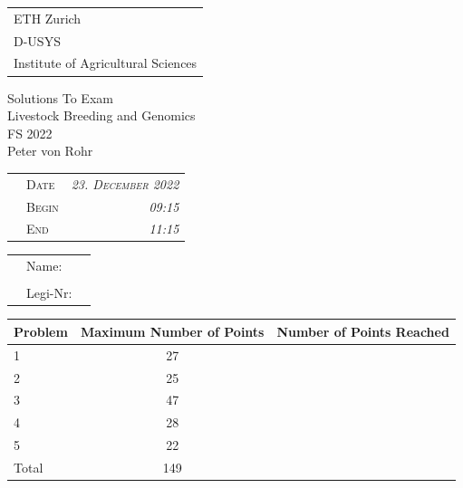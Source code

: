 \documentclass[
]{article}
\author{}
\date{\vspace{-2.5em}}
\begin{document}
\thispagestyle{empty}

\begin{tabular}{l}
ETH Zurich \\
D-USYS\\
Institute of Agricultural Sciences\\
\end{tabular}

\vspace{15ex}
\begin{center}
\huge
Solutions To Exam\\ \vspace{1ex}
Livestock Breeding and Genomics \\  \vspace{1ex}
FS 2022 \\

\normalsize
\vspace{7ex}
Peter von Rohr 
\end{center}

\vspace{7ex}
\begin{tabular}{p{5cm}lr}
  & \textsc{Date}  & \textsc{\emph{23. December 2022}} \\
  & \textsc{Begin} & \textsc{\emph{09:15 }}\\
  & \textsc{End}   & \textsc{\emph{11:15 }}\\ 
\end{tabular}

\vspace{5ex}

\large
\begin{tabular}{p{2.5cm}p{3cm}p{6cm}}
  &  Name:     &  \\
  &            &  \\
  &  Legi-Nr:  & \\
\end{tabular}
\normalsize

\vspace{9ex}
\begin{center}
\begin{tabular}{|p{3cm}|c|c|}
\hline
Problem  &  Maximum Number of Points  &  Number of Points Reached \\
\hline
1        &  27         & \\
\hline
2        &  25         & \\
\hline
3        &  47         & \\
\hline
4        &  28          & \\
\hline
5        &  22          & \\
\hline
Total    &  149    & \\
\hline
\end{tabular}
\end{center}
\end{document}
